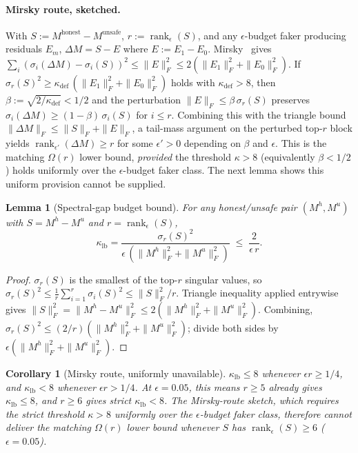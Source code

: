 \documentclass[10pt]{article}
\newtheorem{lemma}[theorem]{Lemma}
\newtheorem{corollary}[theorem]{Corollary}
\theoremstyle{definition}
\theoremstyle{remark}
\begin{document}
\paragraph{Mirsky route, sketched.}
With $S := M^{\mathrm{honest}} - M^{\mathrm{unsafe}}$,
$r := \operatorname{rank}_{\epsilon}(S)$, and any
$\epsilon$-budget faker producing residuals $E_m$,
$\Delta M = S - E$ where $E := E_1 - E_0$.
Mirsky~\citep[][Thm.\ A.4]{stewart1990matrix} gives
$\sum_i (\sigma_i(\Delta M) - \sigma_i(S))^2 \leq
\|E\|_F^2 \leq 2(\|E_1\|_F^2 + \|E_0\|_F^2)$.
If $\sigma_r(S)^2 \geq \kappa_{\mathrm{def}}\,
(\|E_1\|_F^2 + \|E_0\|_F^2)$ holds with
$\kappa_{\mathrm{def}} > 8$, then
$\beta := \sqrt{2/\kappa_{\mathrm{def}}} < 1/2$ and
the perturbation $\|E\|_F \leq \beta\,\sigma_r(S)$
preserves $\sigma_i(\Delta M) \geq (1-\beta)\,\sigma_i(S)$
for $i \leq r$.  Combining this with the triangle bound
$\|\Delta M\|_F \leq \|S\|_F + \|E\|_F$, a tail-mass
argument on the perturbed top-$r$ block yields
$\operatorname{rank}_{\epsilon'}(\Delta M) \geq r$ for
some $\epsilon' > 0$ depending on $\beta$ and
$\epsilon$.  This is the matching $\Omega(r)$ lower
bound, \emph{provided} the threshold $\kappa > 8$
(equivalently $\beta < 1/2$) holds uniformly over the
$\epsilon$-budget faker class.  The next lemma shows
this uniform provision cannot be supplied.

\begin{lemma}[Spectral-gap budget bound]
\label{lem:kappa_obstruction}
For any honest/unsafe pair $(M^h, M^u)$ with
$S = M^h - M^u$ and $r = \operatorname{rank}_{\epsilon}(S)$,
\begin{equation}
  \kappa_{\mathrm{lb}}
   = \frac{\sigma_r(S)^2}
          {\epsilon\,(\|M^h\|_F^2 + \|M^u\|_F^2)}
   \;\leq\; \frac{2}{\epsilon\,r}.
  \label{eq:kappa_obstruction}
\end{equation}
\end{lemma}

\begin{proof}
$\sigma_r(S)$ is the smallest of the top-$r$ singular
values, so $\sigma_r(S)^2 \leq \frac{1}{r}\sum_{i=1}^{r}
\sigma_i(S)^2 \leq \|S\|_F^2/r$.  Triangle inequality
applied entrywise gives $\|S\|_F^2 = \|M^h - M^u\|_F^2
\leq 2(\|M^h\|_F^2 + \|M^u\|_F^2)$.  Combining,
$\sigma_r(S)^2 \leq (2/r)(\|M^h\|_F^2 + \|M^u\|_F^2)$;
divide both sides by $\epsilon(\|M^h\|_F^2 +
\|M^u\|_F^2)$.
\end{proof}

\begin{corollary}[Mirsky route, uniformly unavailable]
\label{cor:mirsky_obstruction}
$\kappa_{\mathrm{lb}} \leq 8$ whenever $\epsilon r \geq
1/4$, and $\kappa_{\mathrm{lb}} < 8$ whenever
$\epsilon r > 1/4$.  At $\epsilon = 0.05$, this means
$r \geq 5$ already gives $\kappa_{\mathrm{lb}} \leq 8$,
and $r \geq 6$ gives strict $\kappa_{\mathrm{lb}} < 8$.
The Mirsky-route sketch, which requires the strict
threshold $\kappa > 8$ uniformly over the
$\epsilon$-budget faker class, therefore cannot deliver
the matching $\Omega(r)$ lower bound whenever $S$ has
$\operatorname{rank}_{\epsilon}(S) \geq 6$
($\epsilon = 0.05$).
\end{corollary}
\end{document}
